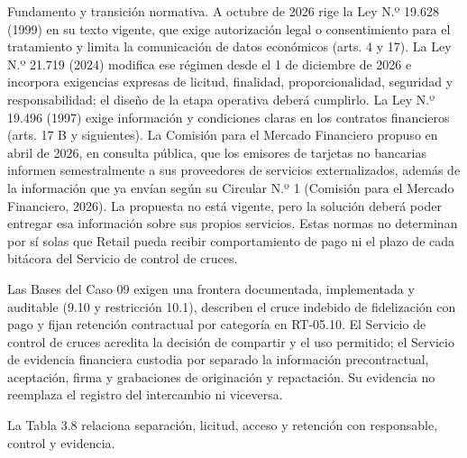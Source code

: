 \documentclass[11pt]{article}
\begin{document}
{Fundamento y transición normativa. A octubre de 2026 rige la Ley N.º 19.628 (1999) en su texto vigente, que exige autorización legal o consentimiento para el tratamiento y limita la comunicación de datos económicos (arts. 4 y 17). La Ley N.º 21.719 (2024) modifica ese régimen desde el 1 de diciembre de 2026 e incorpora exigencias expresas de licitud, finalidad, proporcionalidad, seguridad y responsabilidad; el diseño de la etapa operativa deberá cumplirlo. La Ley N.º 19.496 (1997) exige información y condiciones claras en los contratos financieros (arts. 17 B y siguientes). La Comisión para el Mercado Financiero propuso en abril de 2026, en consulta pública, que los emisores de tarjetas no bancarias informen semestralmente a sus proveedores de servicios externalizados, además de la información que ya envían según su Circular N.º 1 (Comisión para el Mercado Financiero, 2026). La propuesta no está vigente, pero la solución deberá poder entregar esa información sobre sus propios servicios. Estas normas no determinan por sí solas que Retail pueda recibir comportamiento de pago ni el plazo de cada bitácora del Servicio de control de cruces.}

{Las Bases del Caso 09 exigen una frontera documentada, implementada y auditable (9.10 y restricción 10.1), describen el cruce indebido de fidelización con pago y fijan retención contractual por categoría en RT-05.10. El Servicio de control de cruces acredita la decisión de compartir y el uso permitido; el Servicio de evidencia financiera custodia por separado la información precontractual, aceptación, firma y grabaciones de originación y repactación. Su evidencia no reemplaza el registro del intercambio ni viceversa.}

{La Tabla 3.8 relaciona separación, licitud, acceso y retención con responsable, control y evidencia.}
\end{document}
